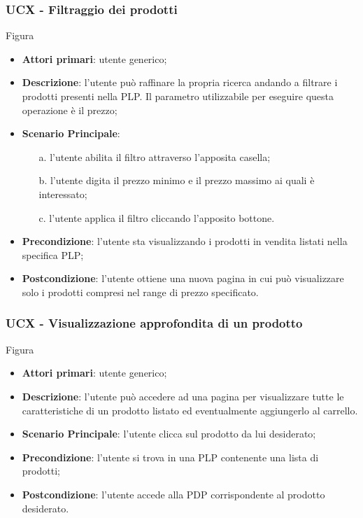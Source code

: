 \subsubsection{UCX - Filtraggio dei prodotti}
Figura \\
\begin{itemize}
\item \textbf{Attori primari}: utente generico;
\item \textbf{Descrizione}: l'utente può raffinare la propria ricerca andando a filtrare i prodotti presenti nella PLP. Il parametro utilizzabile per eseguire questa operazione è il prezzo;
\item \textbf{Scenario Principale}:
\begin{enumerate}
\item[a.] l'utente abilita il filtro attraverso l'apposita casella;
\item[b.] l'utente digita il prezzo minimo e il prezzo massimo ai quali è interessato;
\item[c.] l'utente applica il filtro cliccando l'apposito bottone.
\end{enumerate}
\item \textbf{Precondizione}: l'utente sta visualizzando i prodotti in vendita listati nella specifica PLP;
\item \textbf{Postcondizione}: l'utente ottiene una nuova pagina in cui può visualizzare solo i prodotti compresi nel range di prezzo specificato.
\end{itemize}
\subsubsection{UCX - Visualizzazione approfondita di un prodotto}
Figura \\
\begin{itemize}
\item \textbf{Attori primari}: utente generico;
\item \textbf{Descrizione}: l'utente può accedere ad una pagina per visualizzare tutte le caratteristiche di un prodotto listato ed eventualmente aggiungerlo al carrello.
\item \textbf{Scenario Principale}: l'utente clicca sul prodotto da lui desiderato;
\item \textbf{Precondizione}: l'utente si trova in una PLP contenente una lista di prodotti;
\item \textbf{Postcondizione}: l'utente accede alla PDP corrispondente al prodotto desiderato.
\end{itemize}